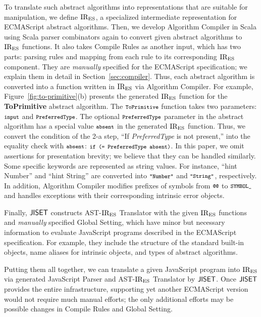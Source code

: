 To translate such abstract algorithms into representations that are
suitable for manipulation, we define \( \text{IR}_\text{ES} \), a specialized
intermediate representation for ECMAScript abstract algorithms.  Then,
we develop \textsf{Algorithm Compiler} in Scala using Scala parser
combinators again to convert given abstract algorithms to \( \text{IR}_\text{ES} \)
functions.  It also takes \textsf{Compile Rules} as another input,
which has two parts: parsing rules and mapping from each rule to its
corresponding \( \text{IR}_\text{ES} \) component.  They are \textit{manually} specified for
the ECMAScript specification; we explain them in detail in
Section~\ref{sec:compiler}.  Thus, each abstract algorithm is
converted into a function written in \( \text{IR}_\text{ES} \) via \textsf{Algorithm Compiler}.
For example, Figure~\ref{fig:to-primitive}(b) presents the generated
\( \text{IR}_\text{ES} \) function for the \textbf{ToPrimitive} abstract algorithm.
The \( \texttt{\footnotesize ToPrimitive} \) function takes two parameters:
\( \texttt{\footnotesize input} \) and \( \texttt{\footnotesize PreferredType} \).  The optional
\( \texttt{\footnotesize PreferredType} \) parameter in the abstract algorithm has
a special value \( \texttt{\footnotesize absent} \) in the generated \( \text{IR}_\text{ES} \) function.
Thus, we convert the condition of the 2-a step,
``If \textit{PreferredType} is not present,'' into the equality check
with \( \texttt{\footnotesize absent} \): \( \texttt{\footnotesize if (= PreferredType absent)} \).
In this paper, we omit assertions for presentation brevity; we believe
that they can be handled similarly.  Some specific keywords are
represented as string values.  For instance, ``hint Number'' and
``hint String'' are converted into \( \texttt{\footnotesize"Number"} \) and
\( \texttt{\footnotesize"String"} \), respectively.  In addition,
\textsf{Algorithm Compiler} modifies prefixes of symbols from
\( \code{@@} \) to \( \texttt{\footnotesize SYMBOL\_} \) and handles exceptions with
their corresponding intrinsic error objects.

Finally, \( \text{\sf JISET} \) constructs {\sf AST-\( \text{IR}_\text{ES} \) Translator} with
the given \( \text{IR}_\text{ES} \) functions and \textit{manually} specified
{\sf Global Setting}, which have minor but necessary information to
evaluate JavaScript programs described in the ECMAScript specification.
For example, they include the structure of the standard built-in
objects, name aliases for intrinsic objects, and types of abstract
algorithms.

Putting them all together, we can translate a given JavaScript program
into \( \text{IR}_\text{ES} \) via generated {\sf JavaScript Parser} and
{\sf AST-\( \text{IR}_\text{ES} \) Translator} by \( \text{\sf JISET} \).
Once \( \text{\sf JISET} \) provides the entire infrastructure, supporting yet
another ECMAScript version would not require much manual efforts;
the only additional efforts may be possible changes in \textsf{Compile Rules}
and {\sf Global Setting}.

